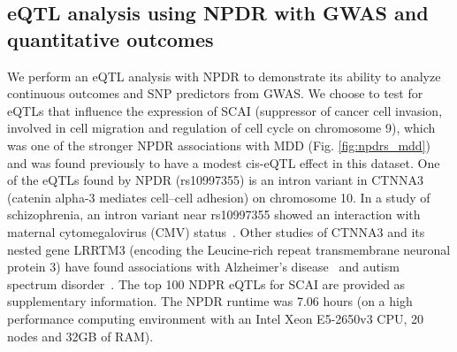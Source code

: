 \documentclass{bioinfo}
\begin{document}
\subsection{eQTL analysis using NPDR with GWAS and quantitative outcomes}

We perform an eQTL analysis with NPDR to demonstrate its ability to analyze continuous outcomes and SNP predictors from GWAS.
We choose to test for eQTLs that influence the expression of SCAI (suppressor of cancer cell invasion, involved in cell migration and regulation of cell cycle on chromosome 9), which was one of the stronger NPDR associations with MDD (Fig. \ref{fig:npdrs_mdd}) and was found previously to have a modest cis-eQTL effect in this dataset\citep{mostafavi14}.
One of the eQTLs found by NPDR (rs10997355) is an intron variant in CTNNA3 (catenin alpha-3 mediates cell–cell adhesion) on chromosome 10.
In a study of schizophrenia, an intron variant near rs10997355 showed an interaction with maternal cytomegalovirus (CMV) status~\citep{borglum2014genome}.
Other studies of CTNNA3 and its nested gene LRRTM3 (encoding the Leucine-rich repeat transmembrane neuronal protein 3) have found associations with Alzheimer's disease~\citep{miyashita2007genetic} and autism spectrum disorder~\citep{wang2009common}.
The top 100 NDPR eQTLs for SCAI are provided as supplementary information.
The NPDR runtime was 7.06 hours (on a high performance computing environment with an Intel Xeon E5-2650v3 CPU, 20 nodes and 32GB of RAM).
\end{document}
